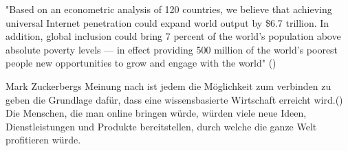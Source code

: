 \documentclass{article}
\begin{document}
"Based on an econometric analysis of 120 countries, we believe that achieving universal Internet penetration could expand world output by \$6.7 trillion.  
In addition, global inclusion could bring 7 percent of the world’s population above absolute poverty levels — in effect providing 500 
million of the world’s poorest people new opportunities to grow and engage with the world"
(\cite{connectWorld})

\medskip

Mark Zuckerbergs Meinung nach ist jedem die Möglichkeit zum verbinden zu geben die Grundlage dafür, dass eine wissensbasierte Wirtschaft erreicht wird.(\cite{HumanRight})
Die Menschen, die man online bringen würde, würden viele neue Ideen, Dienstleistungen und Produkte bereitstellen, durch welche die ganze Welt profitieren würde.
\end{document}
